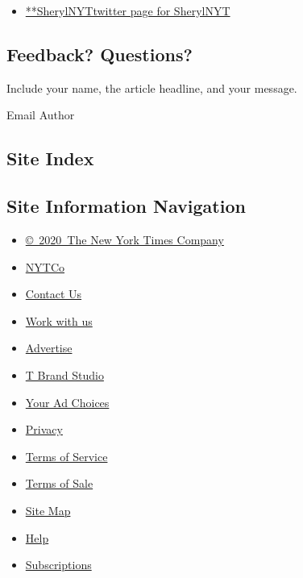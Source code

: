 \begin{itemize}
\tightlist
\item
  \href{https://twitter.com/SherylNYT}{**SherylNYTtwitter page for
  SherylNYT}
\end{itemize}

\hypertarget{feedback-questions}{%
\subsection{Feedback? Questions?}\label{feedback-questions}}

Include your name, the article headline, and your message.

Email Author

\hypertarget{site-index}{%
\subsection{Site Index}\label{site-index}}

\hypertarget{site-information-navigation}{%
\subsection{Site Information
Navigation}\label{site-information-navigation}}

\begin{itemize}
\tightlist
\item
  \href{https://help.nytimes3xbfgragh.onion/hc/en-us/articles/115014792127-Copyright-notice}{©~2020~The
  New York Times Company}
\end{itemize}

\begin{itemize}
\tightlist
\item
  \href{https://www.nytco.com/}{NYTCo}
\item
  \href{https://help.nytimes3xbfgragh.onion/hc/en-us/articles/115015385887-Contact-Us}{Contact
  Us}
\item
  \href{https://www.nytco.com/careers/}{Work with us}
\item
  \href{https://nytmediakit.com/}{Advertise}
\item
  \href{http://www.tbrandstudio.com/}{T Brand Studio}
\item
  \href{https://www.nytimes3xbfgragh.onion/privacy/cookie-policy\#how-do-i-manage-trackers}{Your
  Ad Choices}
\item
  \href{https://www.nytimes3xbfgragh.onion/privacy}{Privacy}
\item
  \href{https://help.nytimes3xbfgragh.onion/hc/en-us/articles/115014893428-Terms-of-service}{Terms
  of Service}
\item
  \href{https://help.nytimes3xbfgragh.onion/hc/en-us/articles/115014893968-Terms-of-sale}{Terms
  of Sale}
\item
  \href{https://spiderbites.nytimes3xbfgragh.onion}{Site Map}
\item
  \href{https://help.nytimes3xbfgragh.onion/hc/en-us}{Help}
\item
  \href{https://www.nytimes3xbfgragh.onion/subscription?campaignId=37WXW}{Subscriptions}
\end{itemize}
